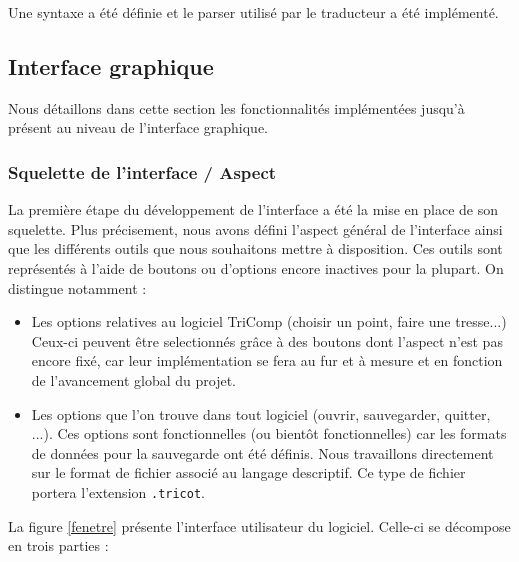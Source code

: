 \documentclass{article}
\begin{document}
Une syntaxe a été définie et le parser utilisé par le traducteur a été implémenté.


\subsection{Interface graphique}

Nous détaillons dans cette section les fonctionnalités implémentées jusqu'à présent au niveau de l'interface graphique.

\subsubsection{Squelette de l'interface / Aspect}

La première étape du développement de l'interface a été la mise en place de son squelette. Plus précisement, nous avons défini l'aspect
général de l'interface ainsi que les différents outils que nous souhaitons mettre à disposition. Ces outils sont représentés à l'aide de
boutons ou d'options encore inactives pour la plupart. On distingue notamment :
\begin{itemize}
  \item Les options relatives au logiciel TriComp (choisir un point, faire une tresse...) Ceux-ci peuvent être selectionnés grâce à des
boutons dont l'aspect n'est pas encore fixé, car leur implémentation se fera au fur et à mesure et en fonction de l'avancement global du
projet.
  \item Les options que l'on trouve dans tout logiciel (ouvrir, sauvegarder, quitter, ...). Ces options sont fonctionnelles (ou bientôt
fonctionnelles) car les formats de données pour la sauvegarde ont été définis. Nous travaillons directement sur le format de fichier
associé au langage descriptif. Ce type de fichier portera l'extension \texttt{.tricot}.
\end{itemize}
La figure \ref{fenetre} présente l'interface utilisateur du logiciel. Celle-ci se décompose en trois parties : 
\end{document}
